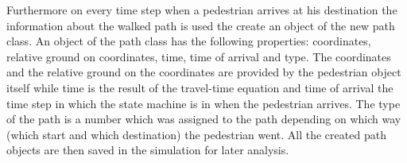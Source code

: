 Furthermore on every time step when a pedestrian arrives at his destination the information about the walked path is used the create an object of the new path class. An object of the path class has the following properties: coordinates, relative ground on coordinates, time, time of arrival and type. The coordinates and the relative ground on the coordinates are provided by the pedestrian object itself while time is the result of the travel-time equation and time of arrival the time step in which the state machine is in when the pedestrian arrives. The type of the path is a number which was assigned to the path depending on which way (which start and which destination) the pedestrian went. All the created path objects are then saved in the simulation for later analysis.